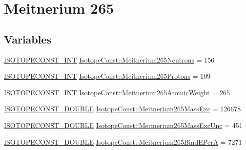 \hypertarget{group___isotope_const-_meitnerium-_mt265}{}\section{Meitnerium 265}
\label{group___isotope_const-_meitnerium-_mt265}
\subsection*{Variables}
\begin{DoxyCompactItemize}
\item 
\mbox{\hyperlink{group___isotope_const-_macros_ga5f18360b3e99483a35c32d789e62621c}{I\+S\+O\+T\+O\+P\+E\+C\+O\+N\+S\+T\+\_\+\+I\+NT}} \mbox{\hyperlink{group___isotope_const-_meitnerium-_mt265_ga33427192340aa4fec23f62cf127b57e9}{Isotope\+Const\+::\+Meitnerium265\+Neutrons}} = 156
\item 
\mbox{\hyperlink{group___isotope_const-_macros_ga5f18360b3e99483a35c32d789e62621c}{I\+S\+O\+T\+O\+P\+E\+C\+O\+N\+S\+T\+\_\+\+I\+NT}} \mbox{\hyperlink{group___isotope_const-_meitnerium-_mt265_ga5390e7d3dfa7b6b267d838ff39874365}{Isotope\+Const\+::\+Meitnerium265\+Protons}} = 109
\item 
\mbox{\hyperlink{group___isotope_const-_macros_ga5f18360b3e99483a35c32d789e62621c}{I\+S\+O\+T\+O\+P\+E\+C\+O\+N\+S\+T\+\_\+\+I\+NT}} \mbox{\hyperlink{group___isotope_const-_meitnerium-_mt265_ga93a890b7a2dc9a064c702d9326fd5a0f}{Isotope\+Const\+::\+Meitnerium265\+Atomic\+Weight}} = 265
\item 
\mbox{\hyperlink{group___isotope_const-_macros_ga8f45a7272ce02c0b4c65c44636ed719a}{I\+S\+O\+T\+O\+P\+E\+C\+O\+N\+S\+T\+\_\+\+D\+O\+U\+B\+LE}} \mbox{\hyperlink{group___isotope_const-_meitnerium-_mt265_gaca4c3543739598da4ee9c7c2557c6451}{Isotope\+Const\+::\+Meitnerium265\+Mass\+Exc}} = 126678
\item 
\mbox{\hyperlink{group___isotope_const-_macros_ga8f45a7272ce02c0b4c65c44636ed719a}{I\+S\+O\+T\+O\+P\+E\+C\+O\+N\+S\+T\+\_\+\+D\+O\+U\+B\+LE}} \mbox{\hyperlink{group___isotope_const-_meitnerium-_mt265_gad20ac161ce3ecd2c0c9724351bc0e7c0}{Isotope\+Const\+::\+Meitnerium265\+Mass\+Exc\+Unc}} = 451
\item 
\mbox{\hyperlink{group___isotope_const-_macros_ga8f45a7272ce02c0b4c65c44636ed719a}{I\+S\+O\+T\+O\+P\+E\+C\+O\+N\+S\+T\+\_\+\+D\+O\+U\+B\+LE}} \mbox{\hyperlink{group___isotope_const-_meitnerium-_mt265_ga3f155a652bf2a49ae3f38b1d1452423b}{Isotope\+Const\+::\+Meitnerium265\+Bind\+E\+PerA}} = 7271
\item 

\end{DoxyCompactItemize}
